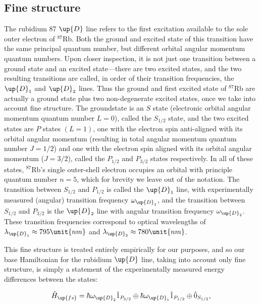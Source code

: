 \subsection{Fine structure}\label{sec:fine_structure}

The rubidium 87 $\up{D}$ line refers to the first excitation available to the sole outer electron of $^{87}$Rb. Both the ground and excited state of this transition have the same principal quantum number, but different orbital angular momentum quantum numbers. Upon closer inspection, it is not just one transition between a ground state and an excited state---there are two excited states, and the two resulting transitions are called, in order of their transition frequencies, the $\up{D}_1$ and  $\up{D}_2$ lines. Thus the ground and first excited state of $^{87}$Rb are actually a ground state plus two non-degenerate excited states, once we take into account fine structure. The groundstate is an $S$ state (electronic orbital angular momentum quantum number $L=0$), called the $S_{1/2}$ state, and the two excited states are $P$ states $(L=1)$, one with the electron spin anti-aligned with its orbital angular momentum (resulting in total angular momentum quantum number $J=1/2$) and one with the electron spin aligned with its orbital angular momentum ($J=3/2$), called the $P_{1/2}$ and $P_{3/2}$ states respectively. In all of these states, $^{87}$Rb's single outer-shell electron occupies an orbital with principle quantum number $n=5$, which for brevity we leave out of the notation. The transition between $S_{1/2}$ and $P_{1/2}$ is called the $\up{D}_1$ line, with experimentally measured (angular) transition frequency $\omega_{\up{D}_1}$, and the transition between $S_{1/2}$ and $P_{3/2}$ is the $\up{D}_2$ line with angular transition frequency $\omega_{\up{D}_2}$. These transition frequencies correspond to optical wavelengths of $\lambda_{\up{D}_1} \approx 795\unit{nm}$ and $\lambda_{\up{D}_2} \approx 780\unit{nm}$\cite{steck_rubidium_2015}.

This fine structure is treated entirely empirically for our purposes, and so our base Hamiltonian for the rubidium $\up{D}$ line, taking into account only fine structure, is simply a statement of the experimentally measured energy differences between the states:

\begin{align}
\hat H_\up{fs} = 
\hbar\omega_{\up{D}_2} \hat1_{P_{3/2}} \oplus
\hbar\omega_{\up{D}_1} \hat1_{P_{1/2}} \oplus
\hat 0_{S_{1/2}},
\end{align}

